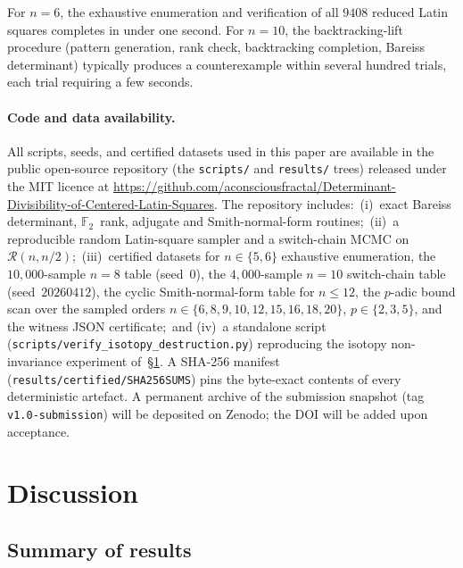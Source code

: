 \documentclass[11pt,a4paper]{article}
\newcommand{\FF}{\mathbb{F}}
\begin{document}
\begin{remark}
For $n=6$, the exhaustive enumeration and verification of all $9408$
reduced Latin squares completes in under one second.  For $n=10$, the
backtracking-lift procedure (pattern generation, rank check, backtracking
completion, Bareiss determinant) typically produces a counterexample
within several hundred trials, each trial requiring a few seconds.
\end{remark}

\paragraph{Code and data availability.}

All scripts, seeds, and certified datasets used in this paper are
available in the public open-source repository (the \texttt{scripts/} and \texttt{results/} trees)
released under the MIT licence at
\url{https://github.com/aconsciousfractal/Determinant-Divisibility-of-Centered-Latin-Squares}.
The repository includes:\ (i)~exact Bareiss determinant, $\FF_2$~rank,
adjugate and Smith-normal-form routines;\ (ii)~a reproducible random
Latin-square sampler and a switch-chain MCMC on $\mathcal{R}(n,n/2)$;\ 
(iii)~certified datasets for $n\in\{5,6\}$ exhaustive enumeration, the
$10{,}000$-sample $n=8$ table (seed~$0$), the $4{,}000$-sample $n=10$
switch-chain table (seed~$20260412$), the cyclic Smith-normal-form table for
$n\le 12$, the $p$-adic bound scan over the sampled orders
$n\in\{6,8,9,10,12,15,16,18,20\}$, $p\in\{2,3,5\}$, and the  witness JSON certificate;\ and
(iv)~a standalone script
(\texttt{scripts/verify\_isotopy\_destruction.py}) reproducing the
isotopy non-invariance experiment of~\S\ref{sec:discussion}.  A
SHA-256 manifest (\texttt{results/certified/SHA256SUMS}) pins the
byte-exact contents of every deterministic artefact.  A permanent
archive of the submission snapshot (tag \texttt{v1.0-submission}) will
be deposited on Zenodo; the DOI will be added upon acceptance.

\section{Discussion}\label{sec:discussion}

\subsection{Summary of results}
\end{document}
